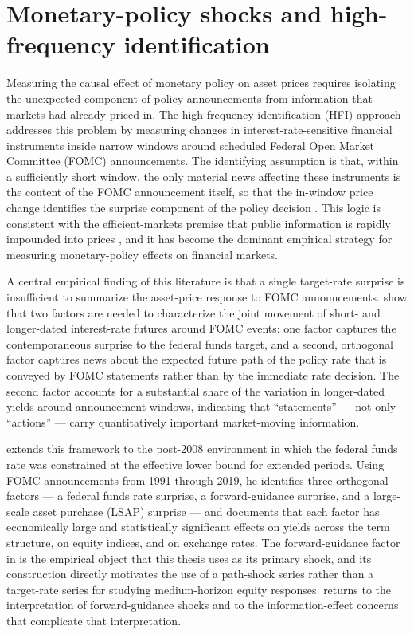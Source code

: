 \section{Monetary-policy shocks and high-frequency identification}
\label{sec:literature-hfi}

Measuring the causal effect of monetary policy on asset prices requires
isolating the unexpected component of policy announcements from
information that markets had already priced in. The high-frequency
identification (HFI) approach addresses this problem by measuring
changes in interest-rate-sensitive financial instruments inside narrow
windows around scheduled Federal Open Market Committee (FOMC)
announcements. The identifying assumption is that, within a sufficiently
short window, the only material news affecting these instruments is the
content of the FOMC announcement itself, so that the in-window price
change identifies the surprise component of the policy decision
\citep{gurkaynakSackSwanson2005}. This logic is consistent with the
efficient-markets premise that public information is rapidly impounded
into prices \citep{fama1970}, and it has become the dominant empirical
strategy for measuring monetary-policy effects on financial markets.

A central empirical finding of this literature is that a single
target-rate surprise is insufficient to summarize the asset-price
response to FOMC announcements. \citet{gurkaynakSackSwanson2005} show
that two factors are needed to characterize the joint movement of
short- and longer-dated interest-rate futures around FOMC events: one
factor captures the contemporaneous surprise to the federal funds
target, and a second, orthogonal factor captures news about the
expected future path of the policy rate that is conveyed by FOMC
statements rather than by the immediate rate decision. The second
factor accounts for a substantial share of the variation in
longer-dated yields around announcement windows, indicating that
``statements'' --- not only ``actions'' --- carry quantitatively
important market-moving information.

\citet{swanson2021} extends this framework to the post-2008 environment
in which the federal funds rate was constrained at the effective lower
bound for extended periods. Using FOMC announcements from 1991 through
2019, he identifies three orthogonal factors --- a federal funds rate
surprise, a forward-guidance surprise, and a large-scale asset purchase
(LSAP) surprise --- and documents that each factor has economically
large and statistically significant effects on yields across the term
structure, on equity indices, and on exchange rates. The forward-guidance
factor in \citet{swanson2021} is the empirical object that this thesis
uses as its primary shock, and its construction directly motivates the
use of a path-shock series rather than a target-rate series for studying
medium-horizon equity responses. 
returns to the interpretation of forward-guidance shocks and to the
information-effect concerns that complicate that interpretation.

